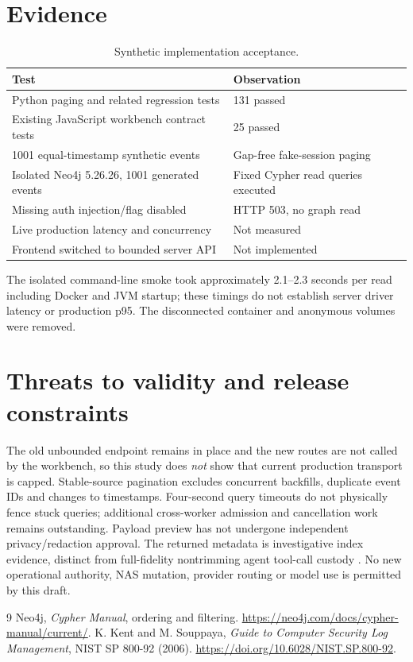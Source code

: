 \documentclass[11pt]{article}
\begin{document}
\section{Evidence}
\begin{table}[h]\centering
\caption{Synthetic implementation acceptance.}
\begin{tabular}{ll}\toprule
Test & Observation\\\midrule
Python paging and related regression tests & 131 passed\\
Existing JavaScript workbench contract tests & 25 passed\\
1001 equal-timestamp synthetic events & Gap-free fake-session paging\\
Isolated Neo4j 5.26.26, 1001 generated events & Fixed Cypher read queries executed\\
Missing auth injection/flag disabled & HTTP 503, no graph read\\
Live production latency and concurrency & Not measured\\
Frontend switched to bounded server API & Not implemented\\
\bottomrule\end{tabular}\end{table}
The isolated command-line smoke took approximately 2.1--2.3 seconds per
read including Docker and JVM startup; these timings do not establish server
driver latency or production p95. The disconnected container and anonymous
volumes were removed.
\section{Threats to validity and release constraints}
The old unbounded endpoint remains in place and the new routes are not
called by the workbench, so this study does \emph{not} show that current
production transport is capped. Stable-source pagination excludes concurrent
backfills, duplicate event IDs and changes to timestamps. Four-second query
timeouts do not physically fence stuck queries; additional cross-worker
admission and cancellation work remains outstanding. Payload preview has
not undergone independent privacy/redaction approval. The returned metadata
is investigative index evidence, distinct from full-fidelity nontrimming
agent tool-call custody \cite{nist92}. No new operational authority, NAS
mutation, provider routing or model use is permitted by this draft.
\begin{thebibliography}{9}
 Neo4j, \emph{Cypher Manual}, ordering and filtering.
\url{https://neo4j.com/docs/cypher-manual/current/}.
 K. Kent and M. Souppaya, \emph{Guide to Computer Security
Log Management}, NIST SP 800-92 (2006).
\url{https://doi.org/10.6028/NIST.SP.800-92}.
\end{thebibliography}
\end{document}
